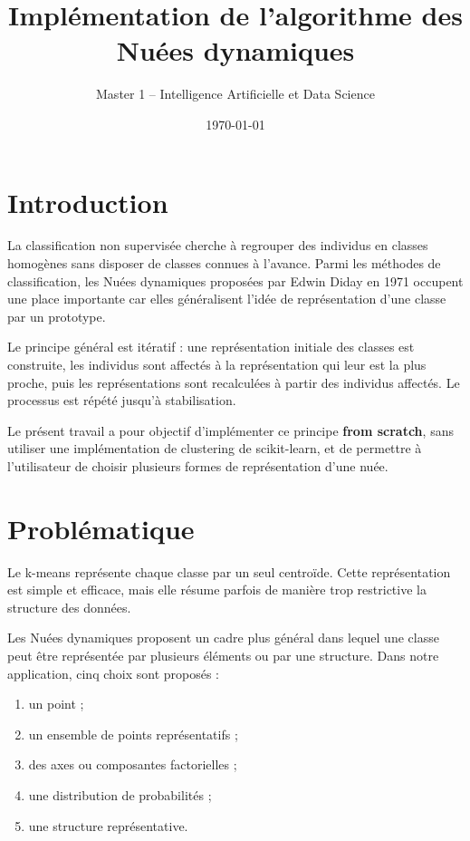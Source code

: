 \documentclass[12pt,a4paper]{article}
\title{\textbf{Implémentation de l'algorithme des Nuées dynamiques}}
\author{Master 1 -- Intelligence Artificielle et Data Science}
\date{\today}
\begin{document}
\maketitle
\tableofcontents
\newpage

\section{Introduction}

La classification non supervisée cherche à regrouper des individus en classes homogènes sans disposer de classes connues à l'avance. Parmi les méthodes de classification, les Nuées dynamiques proposées par Edwin Diday en 1971 occupent une place importante car elles généralisent l'idée de représentation d'une classe par un prototype.

Le principe général est itératif : une représentation initiale des classes est construite, les individus sont affectés à la représentation qui leur est la plus proche, puis les représentations sont recalculées à partir des individus affectés. Le processus est répété jusqu'à stabilisation.

Le présent travail a pour objectif d'implémenter ce principe \textbf{from scratch}, sans utiliser une implémentation de clustering de scikit-learn, et de permettre à l'utilisateur de choisir plusieurs formes de représentation d'une nuée.

\section{Problématique}

Le k-means représente chaque classe par un seul centroïde. Cette représentation est simple et efficace, mais elle résume parfois de manière trop restrictive la structure des données.

Les Nuées dynamiques proposent un cadre plus général dans lequel une classe peut être représentée par plusieurs éléments ou par une structure. Dans notre application, cinq choix sont proposés :

\begin{enumerate}
    \item un point ;
    \item un ensemble de points représentatifs ;
    \item des axes ou composantes factorielles ;
    \item une distribution de probabilités ;
    \item une structure représentative.
\end{enumerate}
\end{document}
